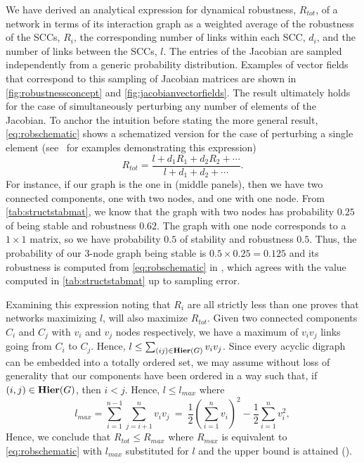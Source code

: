 We have derived an analytical expression for dynamical robustness, $R_{tot}$, of a network in terms of its interaction graph as a weighted average of the robustness of the SCCs, $R_i$, the corresponding number of links within each SCC, $d_i$, and the number of links between the SCCs, $l$. The entries of the Jacobian are sampled independently from a generic probability distribution. Examples of vector fields that correspond to this sampling of Jacobian matrices are shown in \ref{fig:robustnessconcept} and \ref{fig:jacobianvectorfields}. The result ultimately holds for the case of simultaneously perturbing any number of elements of the Jacobian. To anchor the intuition before stating the more general result, \ref{eq:robschematic} shows a schematized version for the case of perturbing a single element  (see $\,$ for examples demonstrating this expression)
\begin{equation}\label{eq:robschematic}
R_{tot} = \frac{l+d_1 R_1 + d_2 R_2 + \cdots}{l+d_1 + d_2 + \cdots}.
\end{equation}
For instance, if our graph is the one in  (middle panels), then we have two connected components, one with two nodes, and one with one node.  From \ref{tab:structstabmat}, we know that the graph with two nodes has probability $0.25$ of being stable and robustness $0.62$.  The graph with one node corresponds to a $1 \times 1$ matrix, so we have probability $0.5$ of stability and robustness $0.5$.  Thus, the probability of our 3-node graph being stable is $0.5 \times 0.25 = 0.125$ and its robustness is computed from \ref{eq:robschematic} in , which agrees with the value computed in \ref{tab:structstabmat} up to sampling error.

Examining this expression noting that $R_i$ are all strictly less than one proves that networks maximizing $l$, will also maximize $R_{tot}$.  Given two connected components $C_i$ and $C_j$ with $v_i$ and $v_j$ nodes respectively, we have a maximum of $v_i v_j$ links going from $C_i$ to $C_j$.  Hence, $l \le \sum_{(ij) \in \mathbf{Hier}(G)} v_i v_j$.  Since every acyclic digraph can be embedded into a totally ordered
set, we may assume without loss of generality that our components have
been ordered in a way such that, if $(i,j) \in \mathbf{Hier}(G)$, then $i <
j$.  Hence, $l \le l_{max}$ where
$$l_{max} = \sum_{i=1}^{n-1}\sum_{j=i+1}^{n}v_i
v_j~=~\frac{1}{2} \left( \sum_{i=1}^{n} v_i \right)^2-\frac{1}{2} \sum_{i=1}^{n}
v_i^2,$$
Hence, we conclude that $R_{tot} \le R_{max}$ where $R_{max}$ is equivalent to \ref{eq:robschematic} with $l_{max}$ substituted for $l$ and the upper bound is attained ().

